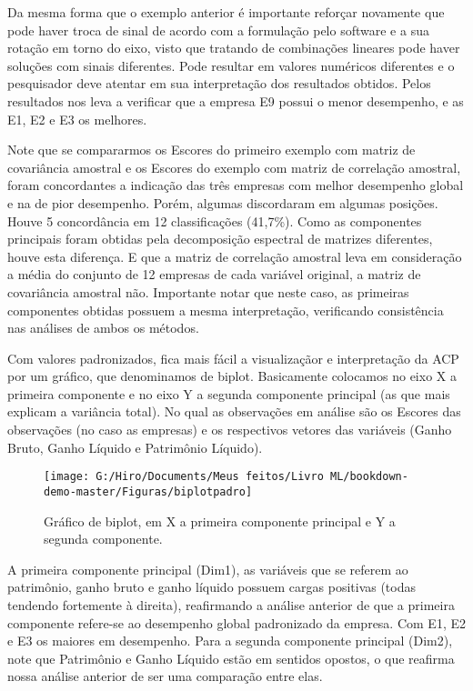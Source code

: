 \documentclass[
]{book}
\begin{document}
Da mesma forma que o exemplo anterior é importante reforçar novamente que pode haver troca de sinal de acordo com a formulação pelo software e a sua rotação em torno do eixo, visto que tratando de combinações lineares pode haver soluções com sinais diferentes. Pode resultar em valores numéricos diferentes e o pesquisador deve atentar em sua interpretação dos resultados obtidos. Pelos resultados nos leva a verificar que a empresa E9 possui o menor desempenho, e as E1, E2 e E3 os melhores.

Note que se compararmos os Escores do primeiro exemplo com matriz de covariância amostral e os Escores do exemplo com matriz de correlação amostral, foram concordantes a indicação das três empresas com melhor desempenho global e na de pior desempenho. Porém, algumas discordaram em algumas posições. Houve 5 concordância em 12 classificações (41,7\%). Como as componentes principais foram obtidas pela decomposição espectral de matrizes diferentes, houve esta diferença. E que a matriz de correlação amostral leva em consideração a média do conjunto de 12 empresas de cada variável original, a matriz de covariância amostral não. Importante notar que neste caso, as primeiras componentes obtidas possuem a mesma interpretação, verificando consistência nas análises de ambos os métodos.

Com valores padronizados, fica mais fácil a visualizaçãor e interpretação da ACP por um gráfico, que denominamos de biplot. Basicamente colocamos no eixo X a primeira componente e no eixo Y a segunda componente principal (as que mais explicam a variância total). No qual as observações em análise são os Escores das observações (no caso as empresas) e os respectivos vetores das variáveis (Ganho Bruto, Ganho Líquido e Patrimônio Líquido).

\begin{figure}

{\centering \texttt{[image: G:/Hiro/Documents/Meus feitos/Livro ML/bookdown-demo-master/Figuras/biplotpadro]} 

}

\caption{Gráfico de biplot, em X a primeira componente principal e Y a segunda componente.}\label{fig:biplotpadro}
\end{figure}



A primeira componente principal (Dim1), as variáveis que se referem ao patrimônio, ganho bruto e ganho líquido possuem cargas positivas (todas tendendo fortemente à direita), reafirmando a análise anterior de que a primeira componente refere-se ao desempenho global padronizado da empresa. Com E1, E2 e E3 os maiores em desempenho.
Para a segunda componente principal (Dim2), note que Patrimônio e Ganho Líquido estão em sentidos opostos, o que reafirma nossa análise anterior de ser uma comparação entre elas.
\end{document}
